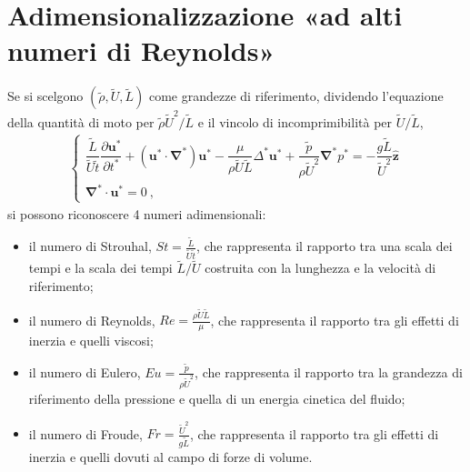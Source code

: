 \documentclass[letterpaper,10pt,italian]{jupyterBook}
\begin{document}
\section{Adimensionalizzazione «ad alti numeri di Reynolds»}
\label{\detokenize{polimi/fluidmechanics-ita/template/capitoli/07_similitudine/07teoria:adimensionalizzazione-ad-alti-numeri-di-reynolds}}
\sphinxAtStartPar
Se si scelgono \((\tilde{\rho},\tilde{U},\tilde{L})\) come grandezze di
riferimento, dividendo l’equazione della quantità di moto per
\(\tilde{\rho} \tilde{U}^2 / \tilde{L}\) e il vincolo di incomprimibilità
per \(\tilde{U} / \tilde{L}\),
\begin{equation*}
\begin{split}\begin{cases}
 \dfrac{\tilde{L}}{\tilde{U}\tilde{t}} \dfrac{\partial \mathbf{u}^*}{\partial t^*} + (\mathbf{u}^* \cdot \mathbf{\nabla}^*) \mathbf{u}^* - \dfrac{\mu }{ \rho \tilde{U} \tilde{L} } \Delta^* \mathbf{u}^* + \dfrac{\tilde{p}}{\rho \tilde{U}^2} \mathbf{\nabla}^* p^* = -\dfrac{g\tilde{L}}{\tilde{U}^2} \mathbf{\hat{z}} \\
 \mathbf{\nabla}^* \cdot \mathbf{u}^* = 0 \ ,
\end{cases}\end{split}
\end{equation*}
\sphinxAtStartPar
si possono riconoscere 4 numeri adimensionali:
\begin{itemize}
\item {} 
\sphinxAtStartPar
il numero di Strouhal, \(St = \frac{\tilde{L}}{\tilde{U}\tilde{t}}\),
che rappresenta il rapporto tra una scala dei tempi e la scala dei
tempi \(\tilde{L}/\tilde{U}\) costruita con la lunghezza e la velocità
di riferimento;

\item {} 
\sphinxAtStartPar
il numero di Reynolds, \(Re = \frac{\rho \tilde{U} \tilde{L} }{\mu}\),
che rappresenta il rapporto tra gli effetti di inerzia e quelli
viscosi;

\item {} 
\sphinxAtStartPar
il numero di Eulero, \(Eu = \frac{\tilde{p}}{\rho \tilde{U}^2}\), che
rappresenta il rapporto tra la grandezza di riferimento della
pressione e quella di un energia cinetica del fluido;

\item {} 
\sphinxAtStartPar
il numero di Froude, \(Fr = \frac{\tilde{U}^2}{g\tilde{L}}\), che
rappresenta il rapporto tra gli effetti di inerzia e quelli dovuti
al campo di forze di volume.

\end{itemize}
\end{document}

